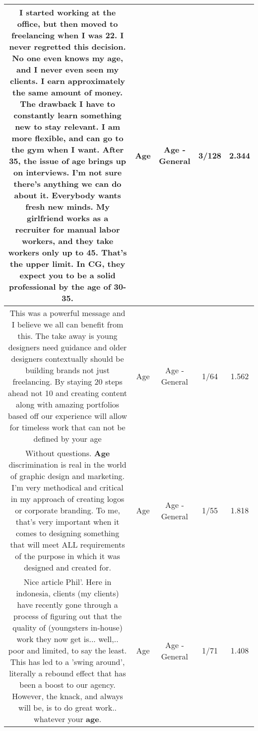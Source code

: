 \documentclass[11pt]{article}
\newlength\mylength
\begin{document}
\begin{center}
\begin{longtable}{|C{.65\mylength}|C{.30\mylength}|C{.12\mylength}|C{.12\mylength}|C{.12\mylength}|}
  \small I started working at the office, but then moved to freelancing when I was 22. I never regretted this decision. No one even knows my \textbf{age}, and I never even seen my clients. I earn approximately the same amount of money. The drawback I have to constantly learn something new to stay relevant. I am more flexible, and can go to the gym when I want. After 35, the issue of \textbf{age} brings up on interviews. I'm not sure there's anything we can do about it. Everybody wants fresh new minds. My girlfriend works as a recruiter for manual labor workers, and they take workers only up to 45. That's the upper limit. In CG, they expect you to be a solid professional by the \textbf{age} of 30-35.\normalsize   & Age & Age - General & 3/128 & 2.344 \\  \hline
  \small This was a powerful message and I believe we all can benefit from this. The take away is young designers need guidance and older designers contextually should be building brands not just freelancing. By staying 20 steps ahead not 10 and creating content along with amazing portfolios based off our experience will allow for timeless work that can not be defined by your age\normalsize   & Age & Age - General & 1/64 & 1.562 \\  \hline
  \small Without questions. \textbf{Age} discrimination is real in the world of graphic design and marketing. I'm very methodical and critical in my approach of creating logos or corporate branding. To me, that's very important when it comes to designing something that will meet ALL requirements of the purpose in which it was designed and created for.\normalsize   & Age & Age - General & 1/55 & 1.818 \\  \hline
  \small Nice article Phil'. Here in indonesia, clients (my clients) have  recently gone through a process of figuring out that the quality of (youngsters in-house) work they now get is... well,.. poor and limited, to say the least. This has led to a 'swing around', literally a rebound effect that has been a boost to our agency. However, the knack, and always will be, is to do great work.. whatever your \textbf{age}.\normalsize   & Age & Age - General & 1/71 & 1.408 \\  \hline

\end{longtable}
\end{center}
\end{document}
